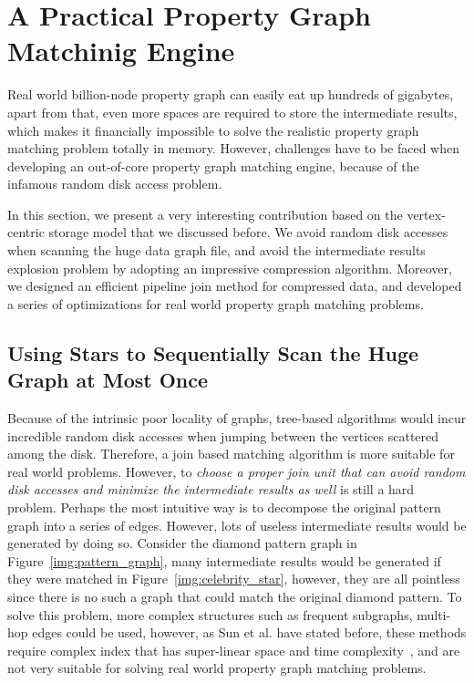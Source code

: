 \section{A Practical Property Graph Matchinig Engine}\label{sec:match}
Real world billion-node property graph can easily eat up hundreds of gigabytes,
apart from that, even more spaces are required to store the intermediate results,
which makes it financially impossible to solve the realistic property graph matching problem totally in memory.
However, challenges have to be faced when developing an out-of-core property graph matching engine,
because of the infamous random disk access problem.

In this section, we present a very interesting contribution based on the vertex-centric storage model that we discussed before.
We avoid random disk accesses when scanning the huge data graph file,
and avoid the intermediate results explosion problem by adopting an impressive compression algorithm.
Moreover, we designed an efficient pipeline join method for compressed data,
and developed a series of optimizations for real world property graph matching problems.
\subsection{Using Stars to Sequentially Scan the Huge Graph at Most Once}\label{sec:match_star}
Because of the intrinsic poor locality of graphs,
tree-based algorithms would incur incredible random disk accesses when jumping between the vertices scattered among the disk.
Therefore, a join based matching algorithm is more suitable for real world problems.
However, to \emph{choose a proper join unit that can avoid random disk accesses and minimize the intermediate results as well} is still a hard problem.
Perhaps the most intuitive way is to decompose the original pattern graph into a series of edges.
However, lots of useless intermediate results would be generated by doing so.
Consider the diamond pattern graph in Figure~\ref{img:pattern_graph},
many intermediate results would be generated if they were matched in Figure~\ref{img:celebrity_star},
however, they are all pointless since there is no such a graph that could match the original diamond pattern.
To solve this problem, more complex structures such as frequent subgraphs, multi-hop edges could be used,
however, as Sun et al\@. have stated before,
these methods require complex index that has super-linear space and time complexity~\cite{DBLP:journals/pvldb/SunWWSL12}, and are not very suitable for solving real world property graph matching problems.

